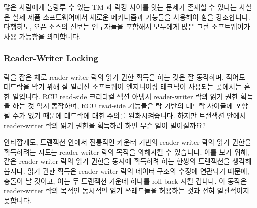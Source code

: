 많은 사람에게 놀랑루 수 있는 TM 과 락킹 사이를 잇는 문제가 존재할 수 있다는
사실은 실제 제품 소프트웨어에서 새로운 메커니즘과 기능들을 사용해야 함을
강조합니다.
다행히도, 오픈 소스의 진보는 연구자들을 포함해서 모두에게 많은 그런
소프트웨어가 사용 가능함을 의미합니다.

\subsubsection{Reader-Writer Locking}
\label{sec:future:Reader-Writer Locking}

락을 잡은 채로 reader-writer 락의 읽기 권한 획득을 하는 것은 잘 동작하며,
적어도 데드락을 막기 위해 잘 알려진 소프트웨어 엔지니어링 테크닉이 사용되는
곳에서는 흔한 일입니다.
RCU read-side 크리티컬 섹션 아넹서 reader-writer 락의 읽기 권한 획득을 하는 것
역시 동작하며, RCU read-side 기능들은 락 기반의 데드락 사이클에 포함될 수가
없기 때문에 데드락에 대한 주의를 완화시켜줍니다.
하지만 트랜잭션 안에서 reader-writer 락의 읽기 권한을 획득하려 하면 무슨 일이
벌어질까요?

안타깝게도, 트랜잭션 안에서 전통적인 카운터 기반의 reader-writer 락의 읽기
권한을 획득하려는 시도는 reader-writer 락의 목적을 와해시킬 수 있습니다.
이를 보기 위해, 같은 reader-writer 락의 읽기 권한을 동시에 획득하려 하는 한쌍의
트랜잭션을 생각해 봅시다.
읽기 권한 획득은 reader-writer 락의 데이터 구조의 수정에 연관되기 때문에,
충돌이 날 것이고, 이는 두 트랜잭션 가운데 하나를 roll back 시킬 겁니다.
이 동작은 reader-writer 락의 목적인 동시적인 읽기 쓰레드들을 허용하는 것과 전혀
일관적이지 못합니다.

